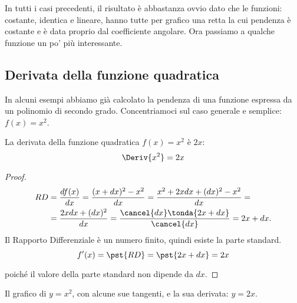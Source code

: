 In tutti i casi precedenti, il risultato è abbastanza ovvio dato che 
le funzioni: costante, identica e lineare, hanno tutte per grafico una retta 
la cui pendenza è costante e è data proprio dal coefficiente angolare.
Ora passiamo a qualche funzione un po' più interessante.

\subsection{Derivata della funzione quadratica}
\label{subsec:differenziazione_derivatafquadratica}
In alcuni esempi abbiamo già calcolato la pendenza di una funzione 
espressa da un polinomio di secondo grado. 
Concentriamoci sul caso generale e semplice: 
\(f(x)=x^2\).
\begin{teorema}
La derivata della funzione quadratica \(f(x)=x^2\) è \(2x\):
\[\Deriv{x^2}=2x\] 
\end{teorema}
\begin{proof}
\begin{align*}
RD &=\dfrac{df(x)}{dx}=\dfrac{(x+dx)^2-x^2}{dx}=
     \dfrac{x^2+2xdx+(dx)^2-x^2}{dx}=\\
   &=\dfrac{2xdx+(dx)^2}{dx}=
     \dfrac{\cancel{dx}\tonda{2x+dx}}{\cancel{dx}} = 2x+dx.
\end{align*}
Il Rapporto Differenziale è un numero finito, quindi esiste la parte 
standard.
\[f'(x) = \pst{RD}=\pst{2x+dx}=2x\]

\vspace{-1em} \hspace{20mm} 
poiché il valore della parte standard non dipende da \(dx\).
\end{proof}

\begin{inaccessibleblock}
\hspace{-20mm}
\end{inaccessibleblock}
\label{img:diff_parabola_con_pendenze}
\begin{center} Il grafico di \(y=x^2\), con alcune sue tangenti, e 
la sua derivata: \(y=2x\).\end{center}

